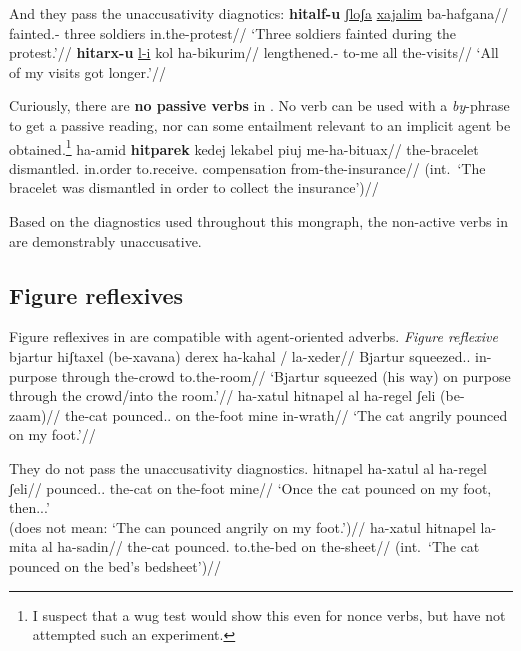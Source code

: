 And they pass the unaccusativity diagnotics:
\ex
	\begingl
	\gla \textbf{hitalf-u} \underline{ʃloʃa} \underline{xajalim} ba-hafgana//
	\glb fainted.- three soldiers in.the-protest//
	\glft `Three soldiers fainted during the protest.'//
	\endgl
\xe
\ex \begingl
	\gla \textbf{hitarx-u} \underline{l-i} kol ha-bikurim//
	\glb lengthened.- to-me all the-visits//
	\glft `All of my visits got longer.'//
	\endgl
\xe

Curiously, there are \textbf{no passive verbs} in {\thit}. No verb can be used with a \emph{by}-phrase to get a passive reading, nor can some entailment relevant to an implicit agent be obtained.\footnote{I suspect that a wug test would show this even for nonce verbs, but have not attempted such an experiment.}
\ex	\ljudge{*} \begingl
	\gla ha-{\ts}amid \textbf{hitparek} kedej lekabel pi{\ts}uj me-ha-bituax//
	\glb the-bracelet dismantled. in.order to.receive. compensation from-the-insurance//
	\glft (int.~`The bracelet was dismantled in order to collect the insurance')//
	\endgl
\xe

Based on the diagnostics used throughout this mongraph, the non-active verbs in {\thit} are demonstrably unaccusative.

	\subsection{Figure reflexives} \label{vz:thit:figrefl}
Figure reflexives in {\thit} are compatible with agent-oriented adverbs.
\pex\label{ex:vz:figrefl-va}\textit{Figure reflexive}
	\a \begingl
		\gla bjartur hiʃtaxel (be-xavana) derex ha-kahal / la-xeder//
		\glb Bjartur squeezed.. in-purpose through the-crowd {} to.the-room//
		\glft `Bjartur squeezed (his way) on purpose through the crowd/into the room.'//
		\endgl
	\a \begingl
		\gla ha-xatul hitnapel al ha-regel ʃeli (be-zaam)//
		\glb the-cat pounced.. on the-foot mine in-wrath//
		\glft `The cat angrily pounced on my foot.'//
		\endgl
\xe

They do not pass the unaccusativity diagnostics.
\ex \ljudge{\#} \begingl
		\gla hitnapel ha-xatul al ha-regel ʃeli//
		\glb pounced.. the-cat on the-foot mine//
		\glft `Once the cat pounced on my foot, then...'\\
			(does not mean: `The can pounced angrily on my foot.')//
	\endgl
\xe
\ex \ljudge{*} \begingl
	\gla ha-xatul hitnapel la-mita al ha-sadin//
	\glb the-cat pounced. to.the-bed on the-sheet//
	\glft (int.~`The cat pounced on the bed's bedsheet')//
	\endgl
\xe

